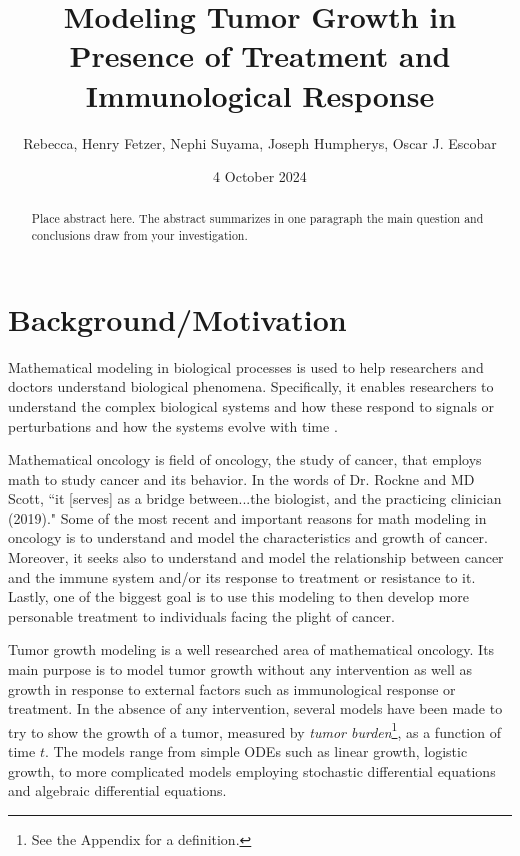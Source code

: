 \documentclass[11pt]{amsart}
\begin{document}
\title{Modeling Tumor Growth in Presence of Treatment and Immunological Response}
\author{Rebecca, Henry Fetzer, Nephi Suyama, Joseph Humpherys, Oscar J. Escobar}

\date{4 October 2024} %

\maketitle %

\begin{abstract}
Place abstract here. The abstract summarizes in one paragraph the main question and conclusions draw from your investigation.
\end{abstract}

\section{Background/Motivation}

Mathematical modeling in biological processes is used to help researchers and doctors understand biological phenomena. 
Specifically, it enables researchers to understand the complex biological systems and how these respond to signals or perturbations and how the systems evolve with time \cite{IntroMathOnc}.


Mathematical oncology is field of oncology, the study of cancer, that employs math to study cancer and its behavior.
In the words of Dr. Rockne and MD Scott, ``it [serves] as a bridge between...the biologist, and the practicing clinician (2019)."
Some of the most recent and important reasons for math modeling in oncology is to understand and model the characteristics and growth of cancer.
Moreover, it seeks also to understand and model the relationship between cancer and the immune system and/or its response to treatment or resistance to it.
Lastly, one of the biggest goal is to use this modeling to then develop more personable treatment to individuals facing the plight of cancer.

Tumor growth modeling is a well researched area of mathematical oncology.
Its main purpose is to model tumor growth without any intervention as well as growth in response to external factors such as immunological response or treatment. 
In the absence of any intervention, several models have been made to try to show the growth of a tumor, measured by \textit{tumor burden}\footnote{See the Appendix for a definition.}, as a function of time $t$.
The models range from simple ODEs such as linear growth, logistic growth, to more complicated models employing stochastic differential equations and algebraic differential equations. 
\end{document}
